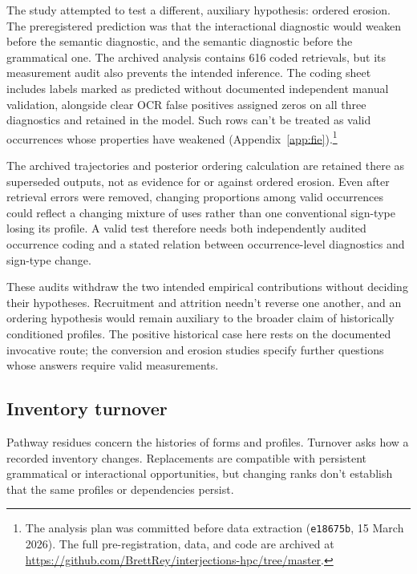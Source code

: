 \documentclass[12pt]{article}
\newif\ifblind
\begin{document}
The  study attempted to test a different, auxiliary hypothesis: ordered erosion. The preregistered prediction was that the interactional diagnostic would weaken before the semantic diagnostic, and the semantic diagnostic before the grammatical one. The archived analysis contains 616 coded retrievals, but its measurement audit also prevents the intended inference. The coding sheet includes labels marked as predicted without documented independent manual validation, alongside clear OCR false positives assigned zeros on all three diagnostics and retained in the model. Such rows can't be treated as valid  occurrences whose properties have weakened (Appendix~\ref{app:fie}).\footnote{The analysis plan was committed before data extraction (\texttt{e18675b}, 15 March 2026). \ifblind The full pre-registration, data, and code are archived at [link removed for blind review].\else The full pre-registration, data, and code are archived at \url{https://github.com/BrettRey/interjections-hpc/tree/master}.\fi}

The archived trajectories and posterior ordering calculation are retained there as superseded outputs, not as evidence for or against ordered erosion. Even after retrieval errors were removed, changing proportions among valid occurrences could reflect a changing mixture of uses rather than one conventional sign-type losing its profile. A valid test therefore needs both independently audited occurrence coding and a stated relation between occurrence-level diagnostics and sign-type change.

These audits withdraw the two intended empirical contributions without deciding their hypotheses. Recruitment and attrition needn't reverse one another, and an ordering hypothesis would remain auxiliary to the broader claim of historically conditioned profiles. The positive historical case here rests on the documented invocative route; the conversion and erosion studies specify further questions whose answers require valid measurements.

\subsection{Inventory turnover}\label{sec:turnover}

Pathway residues concern the histories of forms and profiles. Turnover asks how a recorded inventory changes. Replacements are compatible with persistent grammatical or interactional opportunities, but changing ranks don't establish that the same profiles or dependencies persist.
\end{document}
